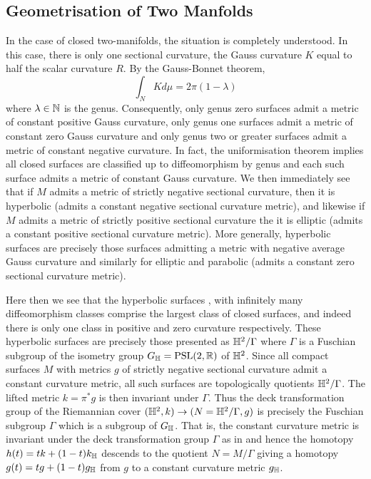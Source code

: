 \documentclass[a4paper, 12pt]{amsart}
\begin{document}
\subsection{Geometrisation of Two Manfolds}
\label{sec:geometrisation_2d}

In the case of closed two-manifolds, the situation is completely understood. In this case, there is only one sectional curvature, the Gauss curvature \(K\) equal to half the scalar curvature \(R\). By the Gauss-Bonnet theorem,
\[
\int_N K d\mu = 2\pi(1-\lambda)
\]
where \(\lambda \in \mathbb{N}\) is the genus. Consequently, only genus zero surfaces admit a metric of constant positive Gauss curvature, only genus one surfaces admit a metric of constant zero Gauss curvature and only genus two or greater surfaces admit a metric of constant negative curvature. In fact, the uniformisation theorem implies all closed surfaces are classified up to diffeomorphism by genus and each such surface admits a metric of constant Gauss curvature. We then immediately see that if \(M\) admits a metric of strictly negative sectional curvature, then it is hyperbolic (admits a constant negative sectional curvature metric), and likewise if \(M\) admits a metric of strictly positive sectional curvature the it is elliptic (admits a constant positive sectional curvature metric). More generally, hyperbolic surfaces are precisely those surfaces admitting a metric with negative average Gauss curvature and similarly for elliptic and parabolic (admits a constant zero sectional curvature metric).

Here then we see that the hyperbolic surfaces , with infinitely many diffeomorphism classes comprise the largest class of closed surfaces, and indeed there is only one class in positive and zero curvature respectively. These hyperbolic surfaces are precisely those presented as \(\mathbb{H}^2/\Gamma\) where \(\Gamma\) is a Fuschian subgroup of the isometry group \(G_{\mathbb{H}} = \text{PSL}(2, \mathbb{R})\) of \(\mathbb{H}^2\). Since all compact surfaces \(M\) with metrics \(g\) of strictly negative sectional curvature admit a constant curvature metric, all such surfaces are topologically quotients \(\mathbb{H}^2/\Gamma\). The lifted metric \(k = \pi^{\ast} g\) is then invariant under \(\Gamma\). Thus the deck transformation group of the Riemannian cover \((\mathbb{H}^2, k) \to (N = \mathbb{H}^2/\Gamma, g)\) is precisely the Fuschian subgroup \(\Gamma\) which is a subgroup of \(G_{\mathbb{H}}\). That is, the constant curvature metric is invariant under the deck transformation group \(\Gamma\) as in  and hence the homotopy \(h(t) = t k + (1-t)k_{\mathbb{H}}\) descends to the quotient \(N = M/\Gamma\) giving a homotopy \(g(t) = t g + (1-t)g_{\mathbb{H}}\) from \(g\) to a constant curvature metric \(g_{\mathbb{H}}\).
\end{document}
